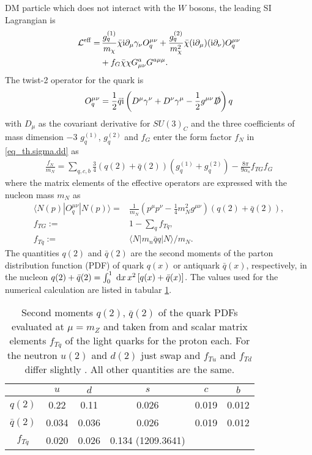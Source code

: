 DM particle which does not interact with the $W$ bosons, the leading SI Lagrangian is
\begin{align}
 \mathcal{L}^\text{eff} =&\, \frac{g_q^{(1)}}{m_\chi} \bar \chi\text{i} \partial_\mu \gamma_\nu O_q^{\mu\nu} + \frac{g_q^{(2)}}{m^2_\chi} \bar \chi(\text{i} \partial_\mu) (\text{i}\partial_\nu) O_q^{\mu\nu} \\
 \nonumber
 &+ f_G \bar \chi \chi G^a_{\mu\nu} G^{a\mu\mu}.
\end{align}
The twist-2 operator for the quark is
\begin{align}
 O_q^{\mu\nu} = \frac12 \bar q \text{i} \left(D^\mu \gamma^\nu + D^\nu \gamma^\mu - \frac12 g^{\mu\nu} \slashed{D}\right) q
\end{align}
with $D_\mu$ as the covariant derivative for $SU(3)_C$ and the three coefficients of mass dimension $-3$ $g_q^{(1)}$, $g_q^{(2)}$ and $f_G$ enter 
the form factor $f_N$ in \eqref{eq_th.sigma.dd} as
\begin{align}
 \frac{f_N}{m_N} = \sum\limits_{q,c,b} \frac34 \left(q(2)+\bar q(2)\right) \left(g_q^{(1)} + g_q^{(2)}\right) - \frac{8\pi}{9\alpha_s}f_{TG}f_G
 \label{eq_ddformfactorA}
\end{align}
where the matrix elements of the effective operators are expressed with the nucleon mass $m_N$ as \cite{1007.2601}
\begin{subequations}
\begin{align}
 \langle N(p)| O_q^{\mu\nu} | N(p)\rangle =& \frac{1}{m_N}\left(p^\mu p^\nu - \frac14 m_N^2 g^{\mu\nu}\right) \left(q(2) + \bar q(2)\right),\\
 f_{TG} :=& 1- \sum\limits_q f_{Tq},\\
 f_{Tq} :=& \langle N|m_n \bar qq |N\rangle /m_N.
\end{align}
\end{subequations}
The quantities $q(2)$ and $\bar q(2)$ are the second moments \cite{0811.1779} of the parton distribution function (PDF) of quark $q(x)$ or antiquark 
$\bar q(x)$, respectively, in the nucleon $q(2)+\bar q(2) = \int_0^1 \; \mathrm{d} x\, x^2 \left[q(x) + \bar q(x)\right]$. The values used for the numerical
calculation are listed in tabular \ref{tab_parton}.
\begin{table}[b]
 \begin{tabular}{c|ccccc}
   & $u$ & $d$ & $s$ & $c$ &$b$ \\
   \hline
  $q(2)$ & 0.22 & 0.11 & 0.026 & 0.019 & 0.012\\
  $\bar q(2)$ & 0.034 & 0.036 & 0.026 & 0.019 & 0.012\\
  $f_{Tq}$ & 0.020& 0.026 & 0.134 (1209.3641)\\
 \end{tabular}
\caption{Second moments $q(2)$, $\bar q(2)$ of the quark PDFs evaluated at $\mu=m_Z$ and taken from \cite{0201195} and scalar matrix elements $f_{Tq}$ of 
the light quarks for the 
proton each. For the neutron $u(2)$ and $d(2)$ just swap and $f_{Tu}$ and $f_{Td}$ differ slightly \cite{9506380}. All other quantities are the same. }
\label{tab_parton}
\end{table}
